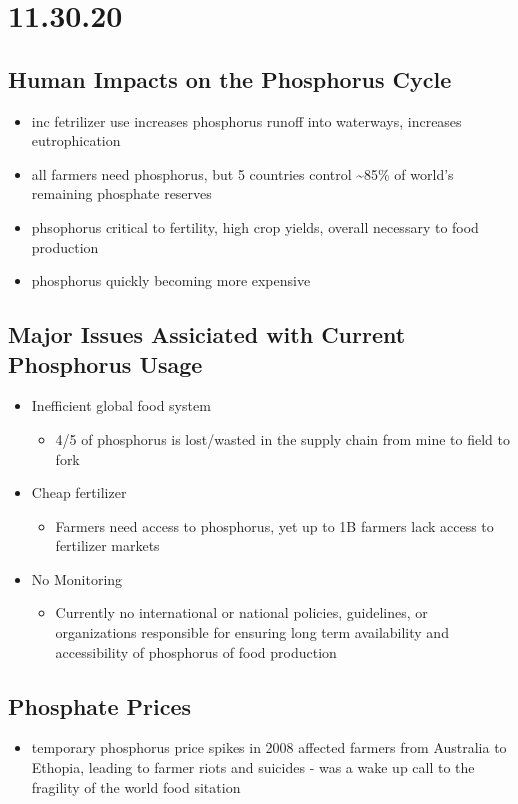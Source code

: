 \documentclass[11pt]{article}
\author{Sudhan Chitgopkar}
\date{\today}
\title{}
\begin{document}
\tableofcontents

\section{11.30.20}
\label{sec:org45c2360}
\subsection{Human Impacts on the Phosphorus Cycle}
\label{sec:org0d776a4}
\begin{itemize}
\item inc fetrilizer use increases phosphorus runoff into waterways, increases eutrophication
\item all farmers need phosphorus, but 5 countries control \textasciitilde{}85\% of world's remaining phosphate reserves
\item phsophorus critical to fertility, high crop yields, overall necessary to food production
\item phosphorus quickly becoming more expensive
\end{itemize}
\subsection{Major Issues Assiciated with Current Phosphorus Usage}
\label{sec:org1ee6842}
\begin{itemize}
\item Inefficient global food system
\begin{itemize}
\item 4/5 of phosphorus is lost/wasted in the supply chain from mine to field to fork
\end{itemize}
\item Cheap fertilizer
\begin{itemize}
\item Farmers need access to phosphorus, yet up to 1B farmers lack access to fertilizer markets
\end{itemize}
\item No Monitoring
\begin{itemize}
\item Currently no international or national policies, guidelines, or organizations responsible for ensuring long term availability and accessibility of phosphorus of food production
\end{itemize}
\end{itemize}
\subsection{Phosphate Prices}
\label{sec:org7c9d50e}
\begin{itemize}
\item temporary phosphorus price spikes in 2008 affected farmers from Australia to Ethopia, leading to farmer riots and suicides - was a wake up call to the fragility of the world food sitation
\end{itemize}
\end{document}
